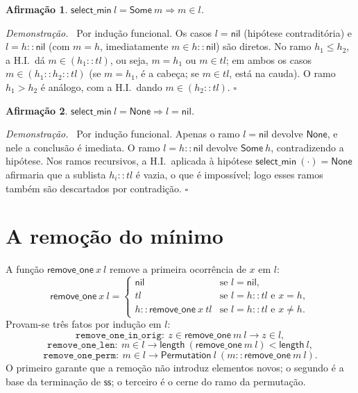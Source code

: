 \documentclass[11pt,a4paper]{article}
\newtheorem*{afirmacao}{Afirma\c{c}\~ao}
\newenvironment{demo}{\noindent\textit{Demonstra\c{c}\~ao.}\ }{\hfill$\square$\par\medskip}
\newcommand{\nil}{\mathsf{nil}}
\newcommand{\cons}{::}
\newcommand{\ssort}{\mathsf{ss}}
\newcommand{\selmin}{\mathsf{select\_min}}
\newcommand{\removeone}{\mathsf{remove\_one}}
\newcommand{\Perm}{\mathsf{Permutation}}
\newcommand{\listlen}{\mathsf{length}}
\begin{document}
\begin{afirmacao}
$\selmin\ l = \mathsf{Some}\ m \Rightarrow m \in l$.
\end{afirmacao}
\begin{demo}
Por indu\c{c}\~ao funcional. Os casos $l = \nil$ (hip\'otese contradit\'oria) e
$l = h\cons\nil$ (com $m = h$, imediatamente $m \in h\cons\nil$) s\~ao diretos.
No ramo $h_1 \le h_2$, a H.I.\ d\'a $m \in (h_1\cons tl)$, ou seja, $m = h_1$ ou
$m \in tl$; em ambos os casos $m \in (h_1\cons h_2\cons tl)$ (se $m = h_1$, \'e a
cabe\c{c}a; se $m \in tl$, est\'a na cauda). O ramo $h_1 > h_2$ \'e an\'alogo, com
a H.I.\ dando $m \in (h_2\cons tl)$.
\end{demo}

\begin{afirmacao}
$\selmin\ l = \mathsf{None} \Rightarrow l = \nil$.
\end{afirmacao}
\begin{demo}
Por indu\c{c}\~ao funcional. Apenas o ramo $l = \nil$ devolve $\mathsf{None}$, e
nele a conclus\~ao \'e imediata. O ramo $l = h\cons\nil$ devolve
$\mathsf{Some}\ h$, contradizendo a hip\'otese. Nos ramos recursivos, a H.I.\
aplicada \`a hip\'otese $\selmin\ (\cdot) = \mathsf{None}$ afirmaria que a sublista
$h_i\cons tl$ \'e vazia, o que \'e imposs\'ivel; logo esses ramos tamb\'em s\~ao
descartados por contradi\c{c}\~ao.
\end{demo}

\section{A remo\c{c}\~ao do m\'inimo}

A fun\c{c}\~ao $\removeone\ x\ l$ remove a primeira ocorr\^encia de $x$ em $l$:
\[
  \removeone\ x\ l =
  \begin{cases}
    \nil & \text{se } l = \nil,\\
    tl & \text{se } l = h\cons tl \text{ e } x = h,\\
    h \cons \removeone\ x\ tl & \text{se } l = h\cons tl \text{ e } x \neq h.
  \end{cases}
\]
Provam-se tr\^es fatos por indu\c{c}\~ao em $l$:
\[
  \texttt{remove\_one\_in\_orig}:\ z \in \removeone\ m\ l \to z \in l,
\]
\[
  \texttt{remove\_one\_len}:\ m \in l \to \listlen\ (\removeone\ m\ l) < \listlen\ l,
\]
\[
  \texttt{remove\_one\_perm}:\ m \in l \to \Perm\ l\ (m \cons \removeone\ m\ l).
\]
O primeiro garante que a remo\c{c}\~ao n\~ao introduz elementos novos; o segundo
\'e a base da termina\c{c}\~ao de $\ssort$; o terceiro \'e o cerne do ramo da
permuta\c{c}\~ao.
\end{document}
